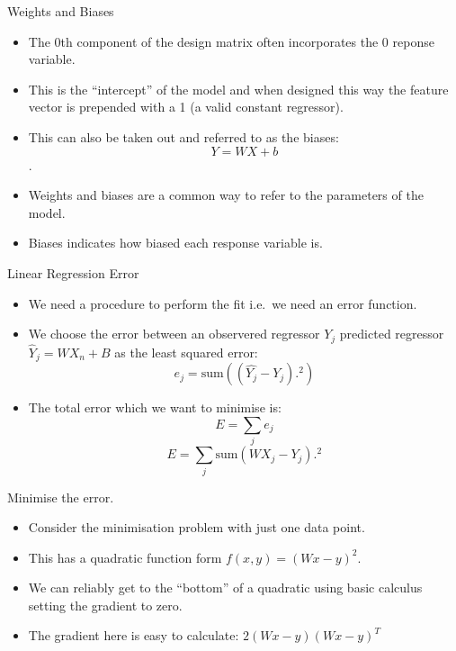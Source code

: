 \documentclass[
  ignorenonframetext,
]{beamer}
\begin{document}
\begin{frame}{Weights and Biases}
\protect\hypertarget{weights-and-biases}{}
\begin{itemize}
\item
  The 0th component of the design matrix often incorporates the 0
  reponse variable.
\item
  This is the ``intercept'' of the model and when designed this way the
  feature vector is prepended with a 1 (a valid constant regressor).
\item
  This can also be taken out and referred to as the biases:
  \[ Y = W X + b\].
\item
  Weights and biases are a common way to refer to the parameters of the
  model.
\item
  Biases indicates how biased each response variable is.
\end{itemize}
\end{frame}

\begin{frame}{Linear Regression Error}
\protect\hypertarget{linear-regression-error}{}
\begin{itemize}
\item
  We need a procedure to perform the fit i.e.~we need an error function.
\item
  We choose the error between an observered regressor \(Y_j\) predicted
  regressor \(\hat{Y}_j = W X_n + B\) as the least squared error:
  \[ e_j = \text{sum}((\hat{Y_j}-Y_j).^2) \]
\item
  The total error which we want to minimise is: \[E = \sum_j e_j\]
  \[E = \sum_j \text{sum}(W X_j - Y_j).^2\]
\end{itemize}
\end{frame}

\begin{frame}{Minimise the error.}
\protect\hypertarget{minimise-the-error.}{}
\begin{itemize}
\item
  Consider the minimisation problem with just one data point.
\item
  This has a quadratic function form \(f(x,y) = (Wx-y)^2\).
\item
  We can reliably get to the ``bottom'' of a quadratic using basic
  calculus setting the gradient to zero.
\item
  The gradient here is easy to calculate: \(2(Wx - y)(Wx-y)^T\)
\end{itemize}
\end{frame}
\end{document}
